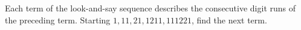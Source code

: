 Each term of the look-and-say sequence describes the consecutive digit runs of the preceding term. Starting $1,11,21,1211,111221$, find the next term.
